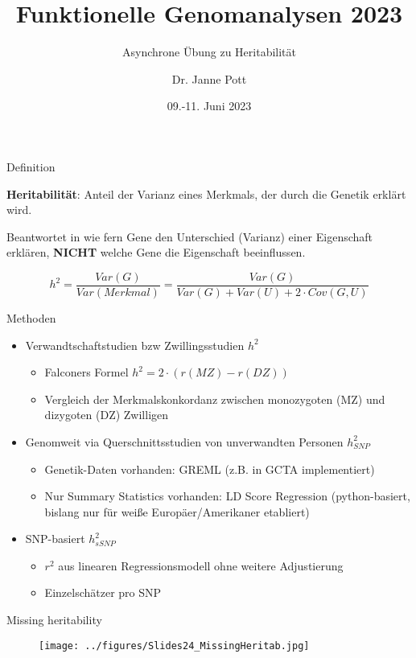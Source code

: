\documentclass{beamer}
\title{Funktionelle Genomanalysen 2023}
\subtitle{Asynchrone Übung zu Heritabilität}
\author{Dr. Janne Pott}
\date{09.-11. Juni 2023}
\begin{document}
\begin{frame}
\titlepage
\end{frame}

\begin{frame}{Definition}

\textbf{Heritabilität}: Anteil der Varianz eines Merkmals, der durch die Genetik erklärt wird. 

Beantwortet in wie fern Gene den Unterschied (Varianz) einer Eigenschaft erklären, \textbf{NICHT} welche Gene die Eigenschaft beeinflussen. 

$$ h^2 = \frac{Var(G)}{Var(Merkmal)} = \frac{Var(G)}{Var(G) + Var(U) + 2 \cdot Cov(G, U)}$$

\end{frame}

\begin{frame}{Methoden}
\begin{itemize}
    \item Verwandtschaftstudien bzw Zwillingsstudien $h^2$
    \begin{itemize}
        \item Falconers Formel $h^2=2 \cdot (r(MZ) - r(DZ))$ 
        \item Vergleich der Merkmalskonkordanz zwischen monozygoten (MZ) und dizygoten (DZ) Zwilligen
    \end{itemize}
    \item Genomweit via Querschnittsstudien von unverwandten Personen $h_{SNP}^2$
    \begin{itemize}
        \item Genetik-Daten vorhanden: GREML (z.B. in GCTA implementiert)
        \item Nur Summary Statistics vorhanden: LD Score Regression (python-basiert, bislang nur für weiße Europäer/Amerikaner etabliert)
    \end{itemize}
    \item SNP-basiert $h_{sSNP}^2$
    \begin{itemize}
        \item $r^2$ aus linearen Regressionsmodell ohne weitere Adjustierung
        \item Einzelschätzer pro SNP 
    \end{itemize}
\end{itemize}
\end{frame}

\begin{frame}{Missing heritability}

\begin{figure}[h]
\begin{center}
\texttt{[image: ../figures/Slides24\_MissingHeritab.jpg]}
\label{fig:Heritab}
\end{center}
\end{figure}

\end{frame}
\end{document}
